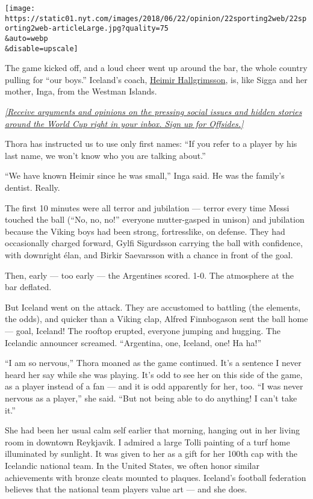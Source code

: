 \texttt{[image: https://static01.nyt.com/images/2018/06/22/opinion/22sporting2web/22sporting2web-articleLarge.jpg?quality=75\\\&auto=webp\\\&disable=upscale]}

The game kicked off, and a loud cheer went up around the bar, the whole
country pulling for ``our boys.'' Iceland's coach,
\href{https://en.wikipedia.org/wiki/Heimir_Hallgr\%C3\%ADmsson}{Heimir
Hallgrimsson}, is, like Sigga and her mother, Inga, from the Westman
Islands.

\href{https://www.nytimes.com/newsletters/offsides?action=click\&module=Intentional\&pgtype=Article}{\emph{{[}Receive
arguments and opinions on the pressing social issues and hidden stories
around the World Cup right in your inbox. Sign up for Offsides.{]}}}

Thora has instructed us to use only first names: ``If you refer to a
player by his last name, we won't know who you are talking about.''

``We have known Heimir since he was small,'' Inga said. He was the
family's dentist. Really.

The first 10 minutes were all terror and jubilation --- terror every
time Messi touched the ball (``No, no, no!'' everyone mutter-gasped in
unison) and jubilation because the Viking boys had been strong,
fortresslike, on defense. They had occasionally charged forward, Gylfi
Sigurdsson carrying the ball with confidence, with downright élan, and
Birkir Saevarsson with a chance in front of the goal.

Then, early --- too early --- the Argentines scored. 1-0. The atmosphere
at the bar deflated.

But Iceland went on the attack. They are accustomed to battling (the
elements, the odds), and quicker than a Viking clap, Alfred Finnbogason
sent the ball home --- goal, Iceland! The rooftop erupted, everyone
jumping and hugging. The Icelandic announcer screamed. ``Argentina, one,
Iceland, one! Ha ha!''

``I am so nervous,'' Thora moaned as the game continued. It's a sentence
I never heard her say while she was playing. It's odd to see her on this
side of the game, as a player instead of a fan --- and it is odd
apparently for her, too. ``I was never nervous as a player,'' she said.
``But not being able to do anything! I can't take it.''

She had been her usual calm self earlier that morning, hanging out in
her living room in downtown Reykjavik. I admired a large Tolli painting
of a turf home illuminated by sunlight. It was given to her as a gift
for her 100th cap with the Icelandic national team. In the United
States, we often honor similar achievements with bronze cleats mounted
to plaques. Iceland's football federation believes that the national
team players value art --- and she does.

